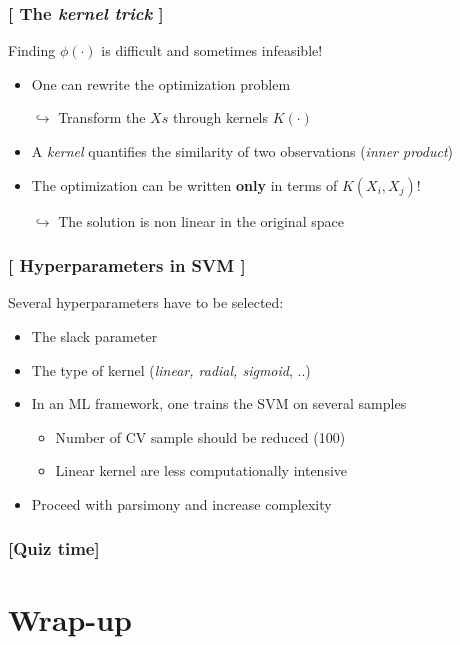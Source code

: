 \documentclass[xcolor=x11names,compress, handhouts]{beamer}
\renewcommand{\(}{\begin{columns}}
\renewcommand{\)}{\end{columns}}
\newcommand{\<}[1]{\begin{column}{#1}}
\renewcommand{\>}{\end{column}}
\begin{document}
\begin{frame}
\frametitle{\textcolor{brique}{[ The \textit{kernel trick} ]}}
Finding $\phi(\cdot)$ is difficult and sometimes infeasible!
\pause
\begin{itemize}[<+->]
   \item One can rewrite the optimization problem
    \item[$\hookrightarrow$] Transform the $Xs$ through kernels $K(\cdot)$ 
    \item A \emph{kernel} quantifies the similarity of two observations (\textit{inner product})
    \item The optimization can be written \textbf{only} in terms of $K(X_i, X_j)$!
    \item[$\hookrightarrow$] The solution is non linear in the  original space
\end{itemize}
\end{frame}


\begin{frame}
\frametitle{\textcolor{brique}{[ Hyperparameters in SVM ]}}
Several hyperparameters have to be selected:
\pause
\begin{itemize}[<+->]
   \item The slack parameter
   \item The type of kernel (\textit{linear, radial, sigmoid}, ..)
   \item In an ML framework,  one trains the SVM on several samples
   \begin{itemize}[<+->]
        \item Number of CV sample should be reduced (100)
        \item Linear kernel are less computationally intensive
    \end{itemize}
    \item Proceed with parsimony and increase complexity 
\end{itemize}
\end{frame}

\begin{frame} %
\frametitle{\textcolor{brique}{[Quiz time]}}
\pause
\begin{itemize}[<+->]
  \item[]
\end{itemize}
\end{frame}


\section{Wrap-up}
\end{document}
